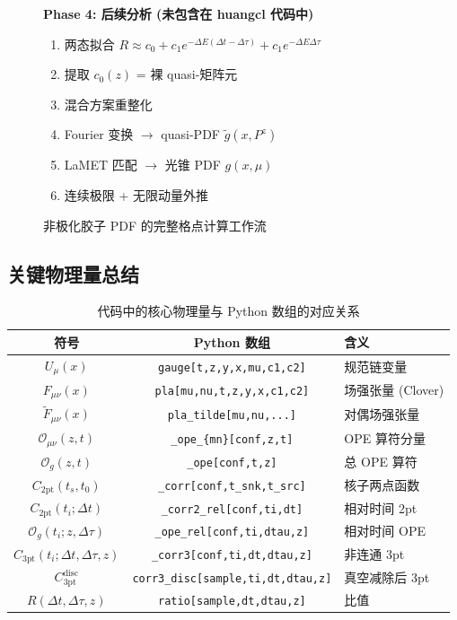 \documentclass[12pt,a4paper]{ctexart}
\newcommand{\Pz}{P^{z}}
\begin{document}
\begin{figure}[H]
{\begin{minipage}{0.92\textwidth}
\medskip
\textbf{Phase 4: 后续分析 (未包含在 huangcl 代码中)}

\begin{enumerate}
    \item 两态拟合 $R \approx c_0 + c_1 e^{-\Delta E(\Delta t - \Delta\tau)} + c_1 e^{-\Delta E \Delta\tau}$
    \item 提取 $c_0(z)$ = 裸 quasi-矩阵元
    \item 混合方案重整化
    \item Fourier 变换 $\to$ quasi-PDF $\tilde{g}(x, \Pz)$
    \item LaMET 匹配 $\to$ 光锥 PDF $g(x, \mu)$
    \item 连续极限 + 无限动量外推
\end{enumerate}
\end{minipage}
}
\caption{非极化胶子 PDF 的完整格点计算工作流}
\label{fig:workflow}
\end{figure}

\subsection{关键物理量总结}

\begin{table}[H]
\centering
\caption{代码中的核心物理量与 Python 数组的对应关系}
\begin{tabular}{c|c|l}
\toprule
\textbf{符号} & \textbf{Python 数组} & \textbf{含义} \\
\midrule
$U_\mu(x)$ & \texttt{gauge[t,z,y,x,mu,c1,c2]} & 规范链变量 \\
$F_{\mu\nu}(x)$ & \texttt{pla[mu,nu,t,z,y,x,c1,c2]} & 场强张量 (Clover) \\
$\tilde{F}_{\mu\nu}(x)$ & \texttt{pla\_tilde[mu,nu,...]} & 对偶场强张量 \\
$\mathcal{O}_{\mu\nu}(z,t)$ & \texttt{\_ope\_\{mn\}[conf,z,t]} & OPE 算符分量 \\
$\mathcal{O}_g(z,t)$ & \texttt{\_ope[conf,t,z]} & 总 OPE 算符 \\
$C_{\text{2pt}}(t_s, t_0)$ & \texttt{\_corr[conf,t\_snk,t\_src]} & 核子两点函数 \\
$C_{\text{2pt}}(t_i; \Delta t)$ & \texttt{\_corr2\_rel[conf,ti,dt]} & 相对时间 2pt \\
$\mathcal{O}_g(t_i; z, \Delta\tau)$ & \texttt{\_ope\_rel[conf,ti,dtau,z]} & 相对时间 OPE \\
$C_{\text{3pt}}(t_i; \Delta t, \Delta\tau, z)$ & \texttt{\_corr3[conf,ti,dt,dtau,z]} & 非连通 3pt \\
$C^{\text{disc}}_{\text{3pt}}$ & \texttt{corr3\_disc[sample,ti,dt,dtau,z]} & 真空减除后 3pt \\
$R(\Delta t, \Delta\tau, z)$ & \texttt{ratio[sample,dt,dtau,z]} & 比值 \\
\bottomrule
\end{tabular}
\end{table}
\end{document}
